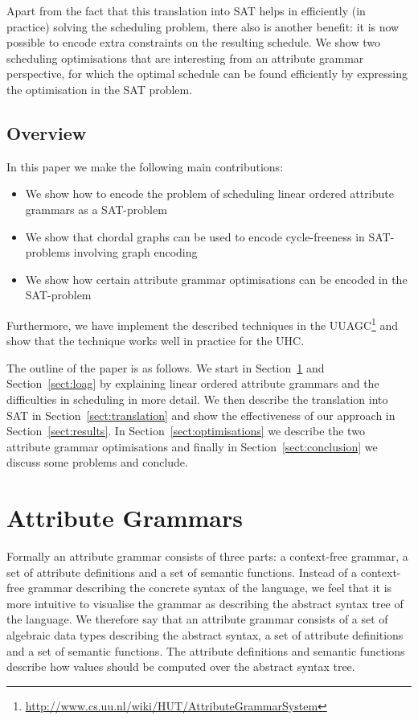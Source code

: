 \documentclass{llncs}
\newcommand{\sectref}[1]{Section~\ref{#1}}
\begin{document}
Apart from the fact that this translation into SAT helps in efficiently (in practice) solving the scheduling problem, there also is another benefit: it is now possible to encode extra constraints on the resulting schedule. We show two scheduling optimisations that are interesting from an attribute grammar perspective, for which the optimal schedule can be found efficiently by expressing the optimisation in the SAT problem.

\subsection{Overview}
In this paper we make the following main contributions:
\begin{itemize}
\item We show how to encode the problem of scheduling linear ordered attribute grammars as a SAT-problem
\item We show that chordal graphs can be used to encode cycle-freeness in SAT-problems involving graph encoding
\item We show how certain attribute grammar optimisations can be encoded in the SAT-problem
\end{itemize}
Furthermore, we have implement the described techniques in the UUAGC\footnote{\url{http://www.cs.uu.nl/wiki/HUT/AttributeGrammarSystem}} \cite{combinator-languages} and show that the technique works well in practice for the UHC.

The outline of the paper is as follows. We start in \sectref{sect:ag} and \sectref{sect:loag} by explaining linear ordered attribute grammars and the difficulties in scheduling in more detail. We then describe the translation into SAT in \sectref{sect:translation} and show the effectiveness of our approach in \sectref{sect:results}. In \sectref{sect:optimisations} we describe the two attribute grammar optimisations and finally in \sectref{sect:conclusion} we discuss some problems and conclude.


\section{Attribute Grammars} \label{sect:ag}
Formally an attribute grammar consists of three parts: a context-free grammar, a set of attribute definitions and a set of semantic functions. Instead of a context-free grammar describing the concrete syntax of the language, we feel that it is more intuitive to visualise the grammar as describing the abstract syntax tree of the language. We therefore say that an attribute grammar consists of a set of algebraic data types describing the abstract syntax, a set of attribute definitions and a set of semantic functions. The attribute definitions and semantic functions describe how values should be computed over the abstract syntax tree.
\end{document}
